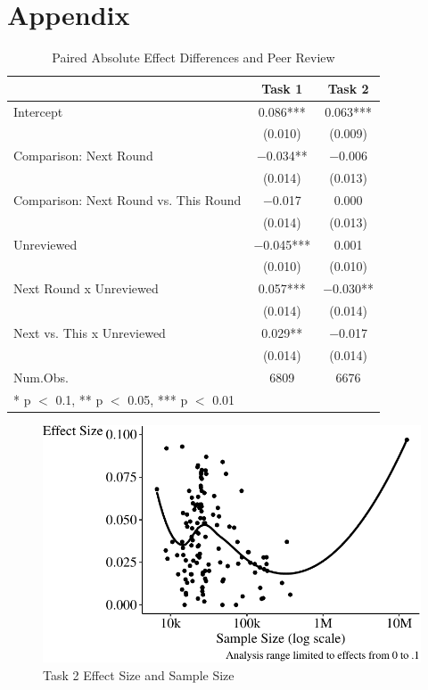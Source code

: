 \documentclass[
  letterpaper,
  DIV=11,
  numbers=noendperiod]{scrartcl}
\begin{document}
\appendix

\hypertarget{appendix}{%
\section*{Appendix}\label{appendix}}

\begin{table}
\centering
\caption{Paired Absolute Effect Differences and Peer Review \label{tab-peer-review-reg}}
\centering
\begin{tabular}[t]{lcc}
\toprule
  & Task 1 & Task 2\\
\midrule
Intercept & \num{0.086}*** & \num{0.063}***\\
 & (\num{0.010}) & (\num{0.009})\\
Comparison: Next Round & \num{-0.034}** & \num{-0.006}\\
 & (\num{0.014}) & \vphantom{1} (\num{0.013})\\
Comparison: Next Round vs. This Round & \num{-0.017} & \num{0.000}\\
 & (\num{0.014}) & (\num{0.013})\\
Unreviewed & \num{-0.045}*** & \num{0.001}\\
 & (\num{0.010}) & (\num{0.010})\\
Next Round x Unreviewed & \num{0.057}*** & \num{-0.030}**\\
 & (\num{0.014}) & \vphantom{1} (\num{0.014})\\
Next vs. This x Unreviewed & \num{0.029}** & \num{-0.017}\\
 & (\num{0.014}) & (\num{0.014})\\
\midrule
Num.Obs. & \num{6809} & \num{6676}\\
\bottomrule
\multicolumn{3}{l}{\rule{0pt}{1em}* p $<$ 0.1, ** p $<$ 0.05, *** p $<$ 0.01}\\
\end{tabular}
\end{table}

\begin{figure}

{\centering \includegraphics{The-Sources-of-Researcher-Variation-in-Economics_files/figure-pdf/fig-effect-vs-sample-1.pdf}

}

\caption{\label{fig-effect-vs-sample}Task 2 Effect Size and Sample Size}

\end{figure}
\end{document}
